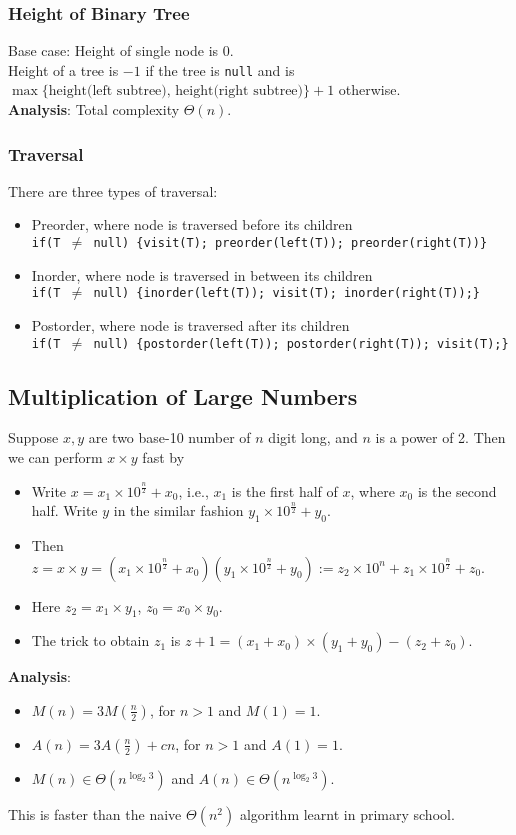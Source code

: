 \documentclass[12pt]{article}
\theoremstyle{definition}
\newcommand{\T}{\Theta}
\begin{document}
\subsubsection{Height of Binary Tree}
Base case: Height of single node is $0$.\\
Height of a tree is $-1$ if the tree is \texttt{null} and is $\max\{\text{height(left subtree), height(right subtree)}\}+1$ otherwise.\\
\textbf{Analysis}: Total complexity $\T(n)$.
\subsubsection{Traversal}
There are three types of traversal:
\begin{itemize}
	\item Preorder, where node is traversed before its children\\
	\texttt{if(T $\neq$ null) \{visit(T); preorder(left(T)); preorder(right(T))\}}
	\item Inorder, where node is traversed in between its children\\
	\texttt{if(T $\neq$ null) \{inorder(left(T)); visit(T); inorder(right(T));\}}
	\item Postorder, where node is traversed after its children\\
	\texttt{if(T $\neq$ null) \{postorder(left(T)); postorder(right(T)); visit(T);\}}
\end{itemize}
\subsection{Multiplication of Large Numbers}
Suppose $x, y$ are two base-10 number of $n$ digit long, and $n$ is a power of 2. Then we can perform $x\times y$ fast by
\begin{itemize}
	\item Write $x = x_1\times 10^\frac{n}{2}+x_0$, i.e., $x_1$ is the first half of $x$, where $x_0$ is the second half. Write $y$ in the similar fashion $y_1\times 10^\frac{n}{2}+y_0$.
	\item Then $z=x\times y = (x_1\times 10^\frac{n}{2}+x_0)(y_1\times 10^\frac{n}{2}+y_0) :=z_2\times 10^n +z_1\times 10^\frac{n}{2}+z_0$.
	\item Here $z_2 = x_1\times y_1$, $z_0 = x_0\times y_0$.
	\item The trick to obtain $z_1$ is $z+1 = (x_1+x_0)\times(y_1+y_0)-(z_2+z_0)$.
\end{itemize}
\textbf{Analysis}:\\
\begin{itemize}
	\item $M(n) = 3M(\frac{n}{2})$, for $n>1$ and $M(1)=1$.
	\item $A(n) = 3A(\frac{n}{2})+ cn$, for $n>1$ and $A(1) = 1$.
	\item $M(n)\in \T(n^{\log_2 3})$ and $A(n)\in \T(n^{\log_2 3})$.
\end{itemize}
This is faster than the naive $\T(n^2)$ algorithm learnt in primary school. 
\end{document}
